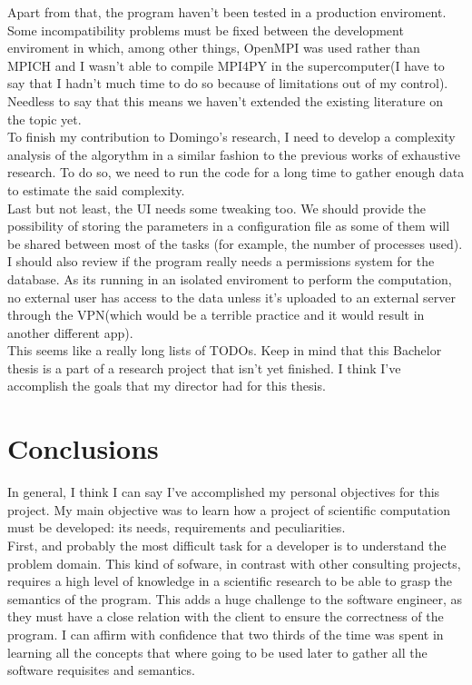 \documentclass{tfg_domingo}
\begin{document}
  Apart from that, the program haven't been tested in a production enviroment.
  Some incompatibility problems must be fixed between the development
  enviroment in which, among other things, OpenMPI was used rather than
  MPICH and I wasn't able to compile MPI4PY in the supercomputer(I have to
  say that I hadn't much time to do so because of limitations out of
  my control). Needless to say that this means we haven't extended the
  existing literature on the topic yet.\\

  To finish my contribution to Domingo's research, I need to develop a
  complexity analysis of the algorythm in a similar fashion to the previous
  works of exhaustive research. To do so, we need to run the code for a long
  time to gather enough data to estimate the said complexity.\\

  Last but not least, the UI needs some tweaking too. We should provide the
  possibility of storing the parameters in a configuration file as some of
  them will be shared between most of the tasks (for example, the number of
  processes used). I should also review if the program really needs a
  permissions system for the database. As its running in an isolated
  enviroment to perform the computation, no external user has access to the
  data unless it's uploaded to an external server through the VPN(which would
  be a terrible practice and it would result in another different app).\\

  This seems like a really long lists of TODOs. Keep in mind that this
  Bachelor thesis is a part of a research project that isn't yet finished. I
  think I've accomplish the goals that my director had for this thesis.

\chapter{Conclusions}

  In general, I think I can say I've accomplished my personal objectives for
  this project. My main objective was to learn how a project of scientific
  computation must be developed: its needs, requirements and peculiarities.\\

  First, and probably the most difficult task for a developer is to understand
  the problem domain. This kind of sofware, in contrast with other consulting
  projects, requires a high level of knowledge in a scientific research to be
  able to grasp the semantics of the program. This adds a huge challenge to
  the software engineer, as they must have a close relation with the client to
  ensure the correctness of the program. I can affirm with confidence that
  two thirds of the time was spent in learning all the concepts that where
  going to be used later to gather all the software requisites and semantics.\\
\end{document}
